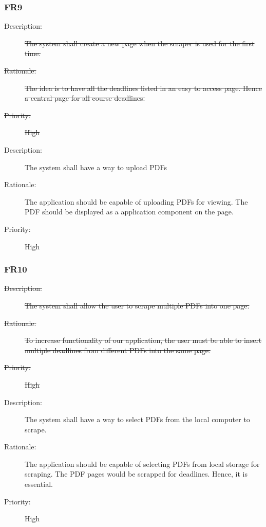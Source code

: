 \documentclass[12pt, titlepage]{article}
\begin{document}
\subsubsection{FR9}
\begin{description}
  \item[\sout{Description:}]\sout{ The system shall create a new page when the scraper is used for the first time.  }
  \item[\sout{Rationale:}] \sout{The idea is to have all the deadlines listed in an easy to access page. Hence a central page for all course deadlines. }
  \item[\sout{Priority:}]\sout{ High}
\end{description}

\begin{description}
  \item[Description:] The system shall have a way to upload PDFs
  \item[Rationale:] The application should be capable of uploading PDFs for viewing. The PDF should be displayed as a application component on the page.
  \item[Priority:] High
\end{description}

\subsubsection{FR10}

\begin{description}
  \item[\sout{Description:}] \sout{The system shall allow the user to scrape multiple PDFs into one page.}
  \item[\sout{Rationale:}] \sout{To increase functionality of our application, the user must be able to insert multiple deadlines from different PDFs into the same page. }
  \item[\sout{Priority:}] \sout{High}
\end{description}

\begin{description}
  \item[Description:] The system shall have a way to select PDFs from the local computer to scrape.  
  \item[Rationale:] The application should be capable of selecting PDFs from local storage for scraping. The PDF pages would be scrapped for deadlines. Hence, it is essential.
  \item[Priority:] High
\end{description}
\end{document}
